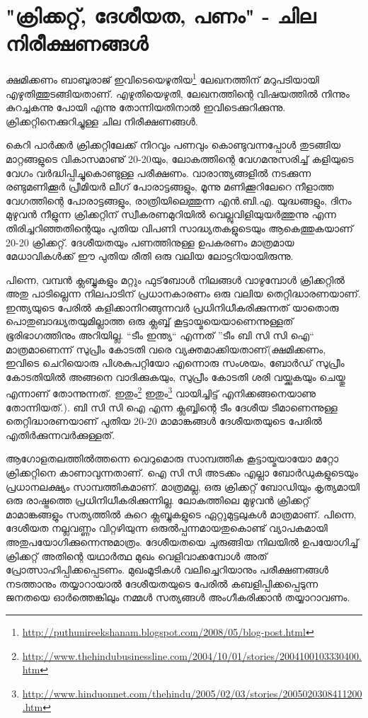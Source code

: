 \section*{"ക്രിക്കറ്റ്, ദേശീയത, പണം" - ചില നിരീക്ഷണങ്ങള്‍}
\vskip 2pt

ക്ഷമിക്കണം ബാബുരാജ് ഇവിടെയെഴുതിയ\footnote{\url{http://puthunireekshanam.blogspot.com/2008/05/blog-post.html}} 
ലേഖനത്തിന് മറുപടിയായി എഴുതിത്തുടങ്ങിയതാണ്. എഴുതിയെഴുതി, ലേഖനത്തിന്റെ വിഷയത്തില്‍ നിന്നും കുറച്ചകന്നു 
പോയി എന്നു തോന്നിയതിനാല്‍ ഇവിടെക്കുറിക്കുന്നു. ക്രിക്കറ്റിനെക്കുറിച്ചുള്ള ചില നിരീക്ഷണങ്ങള്‍.

കെറി പാര്‍ക്കര്‍ ക്രിക്കറ്റിലേക്ക് നിറവും പണവും കൊണ്ടുവന്നപ്പോള്‍ തുടങ്ങിയ മാറ്റങ്ങളുടെ വികാസമാണു് 20-20യും, 
ലോകത്തിന്റെ വേഗമനുസരിച്ച് കളിയുടെ വേഗം വര്‍ദ്ധിപ്പിച്ചുകൊണ്ടുള്ള പരീക്ഷണം. വാരാന്ത്യങ്ങളില്‍ നടക്കുന്ന 
രണ്ടുമണിക്കൂര്‍ പ്രീമിയര്‍ ലീഗ് പോരാട്ടങ്ങളും, മൂന്നു മണിക്കൂറിലേറെ നീളാത്ത വേഗത്തിന്റെ പോരാട്ടങ്ങളും, 
രാത്രിയിലെത്തുന്ന എന്‍.ബി.എ. യുദ്ധങ്ങളും, ദിനം മുഴുവന്‍ നീളുന്ന ക്രിക്കറ്റിന് സ്വീകരണമുറിയില്‍ വെല്ലുവിളിയുയര്‍ത്തുന്നു 
എന്ന തിരിച്ചറിഞ്ഞതിന്റെയും പുതിയ വിപണി സാദ്ധ്യതകളുടെയും ആകെത്തുകയാണ് 20-20 ക്രിക്കറ്റ്. 
ദേശീയതയും പണത്തിനുള്ള ഉപകരണം മാത്രമായ മേധാവികള്‍ക്ക് ഈ പുതിയ രീതി ഒരു വലിയ ലോട്ടറിയായിരുന്നു.

പിന്നെ, വമ്പന്‍ ക്ലബ്ബുകളും മറ്റും ഫുട്‌ബോള്‍ നിലങ്ങള്‍ വാഴുമ്പോള്‍ ക്രിക്കറ്റില്‍ അതു പാടില്ലെന്ന നിലപാടിന് 
പ്രധാനകാരണം ഒരു വലിയ തെറ്റിദ്ധാരണയാണ്. ഇന്ത്യയുടെ പേരില്‍ കളിക്കാനിറങ്ങുന്നവര്‍ പ്രധിനിധീകരിക്കുന്നത് 
യാതൊരു പൊതുബാദ്ധ്യതയുമില്ലാത്ത ഒരു ക്ലബ്ബ് കൂട്ടായ്മയെയാണെന്നുള്ളത് ഭൂരിഭാഗത്തിനും അറിയില്ല. ``ടീം ഇന്ത്യ`` എന്നത് ''ടീം ബി സി സി ഐ`` 
മാത്രമാണെന്ന് സുപ്രീം കോടതി വരെ വ്യക്തമാക്കിയതാണ്(ക്ഷമിക്കണം, ഇവിടെ ചെറിയൊരു പിശകുപറ്റിയോ എന്നൊരു സംശയം, 
ബോര്‍ഡ് സുപ്രീം കോടതിയില്‍ അങ്ങനെ വാദിക്കുകയും, സുപ്രീം കോടതി ശരി വയ്ക്കുകയും ചെയ്തു എന്നാണ് തോന്നുന്നത്. 
ഇതും\footnote{\url{http://www.thehindubusinessline.com/2004/10/01/stories/2004100103330400.htm}} 
ഇതും\footnote{\url{http://www.hinduonnet.com/thehindu/2005/02/03/stories/2005020308411200.htm}} 
വായിച്ചിട്ട് എനിക്കങ്ങനെയാണു തോന്നിയത്.). ബി സി സി ഐ എന്ന ക്ലബ്ബിന്റെ ടീം ദേശീയ ടീമാണെന്നുള്ള 
തെറ്റിദ്ധാരണയാണ് പുതിയ 20-20 മാമാങ്കങ്ങള്‍ ദേശീയതയുടെ പേരില്‍ എതിര്‍ക്കുന്നവര്‍ക്കുള്ളത്.

ആഗോളതലത്തില്‍ത്തന്നെ വെറുമൊരു സാമ്പത്തിക കൂട്ടായ്മയായോ മറ്റോ ക്രിക്കറ്റിനെ കാണാവുന്നതാണ്. 
ഐ സി സി അടക്കം എല്ലാ ബോര്‍ഡുകളുടെയും പ്രധാനലക്ഷ്യം സാമ്പത്തികമാണ്. മാത്രമല്ല, ഒരു ക്രിക്കറ്റ് ബോഡിയും 
കൃത്യമായി ഒരു രാഷ്ട്രത്തെ പ്രധിനിധീകരിക്കുന്നില്ല. ലോകത്തിലെ മുഴുവന്‍ ക്രിക്കറ്റ് മാമാങ്കങ്ങളും സത്യത്തില്‍ കുറെ 
ക്ലബ്ബുകളുടെ ഏറ്റുമുട്ടലുകള്‍ മാത്രമാണ്. പിന്നെ, ദേശീയത നല്ലവണ്ണം വിറ്റഴിയുന്ന ഒരുല്‍പ്പന്നമായതുകൊണ്ട് വ്യാപകമായി 
അതുപയോഗിക്കുന്നെന്നുമാത്രം. ദേശീയതയെ ചുരുങ്ങിയ നിലയില്‍ ഉപയോഗിച്ച് ക്രിക്കറ്റ് അതിന്റെ യഥാര്‍ത്ഥ മുഖം 
വെളിവാക്കമ്പോള്‍ അത് പ്രോത്സാഹിപ്പിക്കപ്പെടണം. മുഖംമൂടികള്‍ വലിച്ചെറിയാനും പരീക്ഷണങ്ങള്‍ നടത്താനും 
തയ്യാറായാല്‍ ദേശീയതയുടെ പേരില്‍ കബളിപ്പിക്കപ്പെടുന്ന ജനതയെ ഓര്‍ത്തെങ്കിലും നമ്മള്‍ സത്യങ്ങള്‍ അംഗീകരിക്കാന്‍ 
തയ്യാറാവണം.

